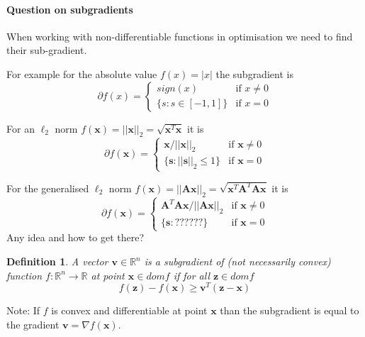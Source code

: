 \documentclass[a4paper]{article}
\newcommand{\vc}[1]{\mathbf{#1}}
\theoremstyle{dotless}
\newtheorem{definition}{Definition}
\numberwithin{equation}{section}
\begin{document}
\setlength{\parindent}{0pt}
\setlength{\parskip}{1ex plus 0.5ex minus 0.2ex}

\paragraph{Question on subgradients}
When working with non-differentiable functions in optimisation we need to find their sub-gradient.

For example for the absolute value $f(x) = |x|$
the subgradient is 
\begin{equation}
\partial f(x) =   
\begin{cases} 
   sign(x) & \text{if } x \neq 0 \\
   \{s: s \in [-1,1]\} & \text{if } x = 0
  \end{cases}
\end{equation}

For an $\ell_2$ norm  $f(\vc{x}) = ||\vc{x}||_2 = \sqrt{\vc{x}^T \vc{x}}$ it is
\begin{equation}
\partial f(\vc{x}) =   
\begin{cases} 
   \vc{x}/||\vc{x}||_2 & \text{if } \vc{x} \neq 0 \\
   \{\vc{s}: ||\vc{s}||_2 \leq 1\} & \text{if } \vc{x} = 0
  \end{cases}
\end{equation}

For the generalised $\ell_2$ norm  $f(\vc{x}) = ||\vc{A} \vc{x}||_2 = \sqrt{\vc{x}^T \vc{A}^T \vc{A} \vc{x}}$ it is
\begin{equation}
\partial f(\vc{x}) =   
\begin{cases} 
   \vc{A}^T \vc{A} \vc{x}/||\vc{A} \vc{x}||_2 & \text{if } \vc{x} \neq 0 \\
   \{\vc{s}: ?????? \} & \text{if } \vc{x} = 0
  \end{cases}
\end{equation}
Any idea and how to get there?

\begin{definition}
A vector $\vc{v} \in \mathbb{R}^n$ is a subgradient of (not necessarily convex) function $f:\mathbb{R}^n \to \mathbb{R}$ at point $\vc{x} \in dom f$ if for all $\vc{z} \in dom f$
\begin{equation}\label{eq:DefSubgradient}
f(\vc{z}) - f(\vc{x}) \geq \vc{v}^T (\vc{z} - \vc{x})
\end{equation}
\end{definition}
Note: If $f$ is convex and differentiable at point $\vc{x}$ than the subgradient is equal to the gradient $\vc{v} = \nabla f(\vc{x})$.
\end{document}
